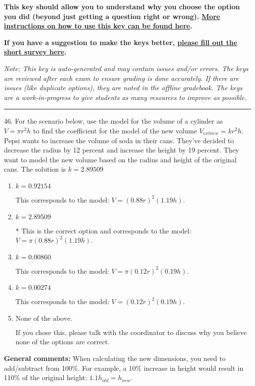 \documentclass{extbook}[14pt]
\begin{document}
\textbf{This key should allow you to understand why you choose the option you did (beyond just getting a question right or wrong). \href{https://xronos.clas.ufl.edu/mac1105spring2020/courseDescriptionAndMisc/Exams/LearningFromResults}{More instructions on how to use this key can be found here}.}

\textbf{If you have a suggestion to make the keys better, \href{https://forms.gle/CZkbZmPbC9XALEE88}{please fill out the short survey here}.}

\textit{Note: This key is auto-generated and may contain issues and/or errors. The keys are reviewed after each exam to ensure grading is done accurately. If there are issues (like duplicate options), they are noted in the offline gradebook. The keys are a work-in-progress to give students as many resources to improve as possible.}

\rule{\textwidth}{0.4pt}

46. For the scenario below, use the model for the volume of a cylinder as $V = \pi r^2 h$ to find the coefficient for the model of the new volume $V_{	ext{new}} = k r^2 h$.
Pepsi wants to increase the volume of soda in their cans. They've decided to decrease the radius by 12 percent and increase the height by 19 percent. They want to model the new volume based on the radius and height of the original cans. 
The solution is $ k = 2.89509 $ 

\begin{enumerate}[label=\Alph*.] 
\item $ k = 0.92154 $ 

 This corresponds to the model: $V = (0.88 r)^2 (1.19 h)$. 
\item $ k = 2.89509 $ 

 * This is the correct option and corresponds to the model: $V = \pi (0.88 r)^2 (1.19 h)$. 
\item $ k = 0.00860 $ 

 This corresponds to the model: $V = \pi (0.12 r)^2 (0.19 h)$. 
\item $ k = 0.00274 $ 

 This corresponds to the model: $V = (0.12 r)^2 (0.19 h)$. 
\item $ \text{None of the above.} $ 

 If you chose this, please talk with the coordinator to discuss why you believe none of the options are correct. 
\end{enumerate} 
 
\textbf{General comments:} When calculating the new dimensions, you need to add/subtract from 100\%. For example, a 10\% increase in height would result in 110\% of the original height: $1.1h_{old} = h_{new}$.
\end{document}
